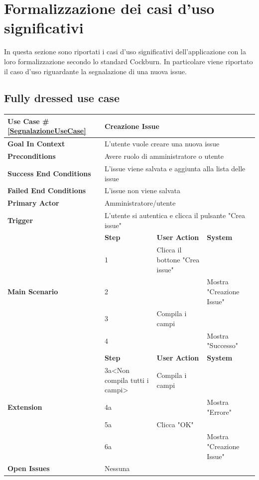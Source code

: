 \section{Formalizzazione dei casi d'uso significativi}\label{FormalizzazioneUseCase}
In questa sezione sono riportati i casi d'uso significativi dell'applicazione
con la loro formalizzazione secondo lo standard Cockburn.
In particolare viene riportato il caso d'uso riguardante la segnalazione di una nuova issue.

\subsection{Fully dressed use case}

\begin{table}[H]    
\small  
\def\arraystretch{1.3}

\begin{tabularx}{\linewidth}{|l|X|X|X|}

    \hline \textbf{Use Case} \#\ref{SegnalazioneUseCase} & 
    \multicolumn{3}{l|}{Creazione Issue} \\ 
    \hline \textbf{Goal In Context} & 
    \multicolumn{3}{p{10cm}|}{L'utente vuole creare una nuova issue} \\
    \hline \textbf{Preconditions} &
    \multicolumn{3}{p{10cm}|}{Avere ruolo di amministratore o utente} \\
    \hline \textbf{Success End Conditions} &
    \multicolumn{3}{p{10cm}|}{L'issue viene salvata e aggiunta alla lista delle issue} \\
    \hline \textbf{Failed End Conditions} &
    \multicolumn{3}{p{10cm}|}{L'issue non viene salvata} \\
    \hline \textbf{Primary Actor} &
    \multicolumn{3}{p{10cm}|}{Amministratore/utente} \\
    \hline \textbf{Trigger} & 
    \multicolumn{3}{p{10cm}|}{L'utente si autentica e clicca il pulsante "Crea issue"} \\
    \hline \multirow{5}{*}{\textbf{Main Scenario}} & \textbf{Step} & \textbf{User Action} & \textbf{System} \\
    \cline{2-4} & 1 & Clicca il bottone "Crea issue" & \\
    \cline{2-4} & 2 & & Mostra "Creazione Issue"\\
    \cline{2-4} & 3 & Compila i campi & \\
    \cline{2-4} & 4 &  & Mostra "Successo"\\
    \hline \multirow{5}{*}{\textbf{Extension}} & \textbf{Step} & \textbf{User Action} & \textbf{System} \\
    \cline{2-4} & 3a<Non compila tutti i campi> & Compila i campi & \\
    \cline{2-4} & 4a & & Mostra "Errore" \\
    \cline{2-4} & 5a & Clicca "OK" & \\
    \cline{2-4} & 6a & & Mostra "Creazione Issue" \\
    \hline \textbf{Open Issues} & \multicolumn{3}{l|}{Nessuna} \\
    \hline

\end{tabularx}

\end{table}
